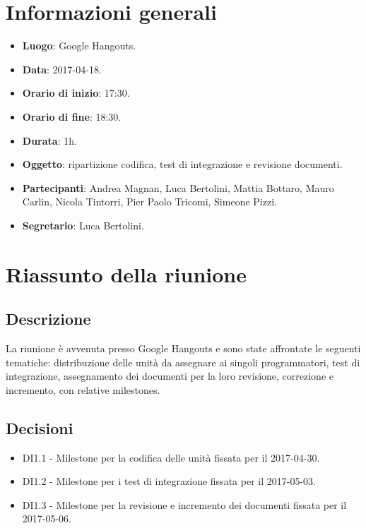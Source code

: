 \documentclass[a4paper,titlepage]{article}
\begin{document}
\maketitle
\begin{diario}
\end{diario}
\newpage
\tableofcontents

\newpage
\section{Informazioni generali}
\label{sec:Informazioni}

\begin{itemize}
  \item \textbf{Luogo}: Google Hangouts.
  \item \textbf{Data}: 2017-04-18.
  \item \textbf{Orario di inizio}: 17:30.
  \item \textbf{Orario di fine}: 18:30.
  \item \textbf{Durata}: 1h.
  \item \textbf{Oggetto}: ripartizione codifica, test di integrazione e revisione documenti.
  \item \textbf{Partecipanti}: Andrea Magnan, Luca Bertolini, Mattia Bottaro, Mauro Carlin, Nicola Tintorri, Pier Paolo Tricomi, Simeone Pizzi.
  \item \textbf{Segretario}: Luca Bertolini.

\end{itemize}
\section{Riassunto della riunione}
\label{sec:RiassuntoRiunione}
 \subsection{Descrizione}
La riunione è avvenuta presso Google Hangouts e sono state affrontate le seguenti tematiche: distribuzione delle unità da assegnare ai singoli programmatori, test di integrazione, assegnamento dei documenti per la loro revisione, correzione e incremento, con relative milestones.
 \subsection{Decisioni}
 \begin{itemize}
  \item DI1.1 - Milestone per la codifica delle unità fissata per il 2017-04-30.
  \item DI1.2 - Milestone per i test di integrazione fissata per il 2017-05-03.  
  \item DI1.3 - Milestone per la revisione e incremento dei documenti fissata per il 2017-05-06.
 \end{itemize}
\end{document}
